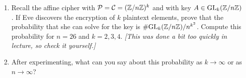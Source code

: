 \documentclass[11pt]{amsart}
\newcounter{problem}
\begin{document}
\begin{problem}
\begin{enumerate}
\item Recall the affine cipher with $\mathcal{P} = \mathcal{C} = (\mathbb{Z}/n\mathbb{Z})^k$ and
with key $A \in \mathrm{GL}_k(\mathbb{Z}/n\mathbb{Z})$.  If Eve discovers the encryption of
$k$ plaintext elements, prove that the probability that she can solve
for the key is $\#\mathrm{GL}_k(\mathbb{Z}/n\mathbb{Z})/n^{k^2}$.  Compute this probability
for $n=26$ and $k=2,3,4$.  \emph{[This was done a bit too quickly in
lecture, so check it yourself.]}

\item After experimenting, what can you say about this probability as $k \to \infty$ or as
$n\to \infty$?
\end{enumerate}
\end{problem}

\vfill
\end{document}
